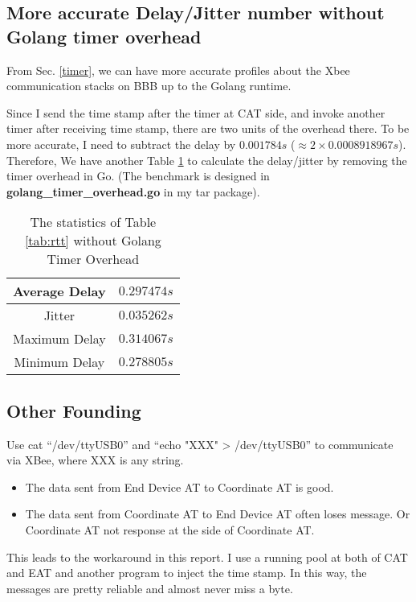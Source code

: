 \documentclass[a4paper,12pt]{article}
\theoremstyle{mytheor}
\begin{document}
\subsection{More accurate Delay/Jitter number without Golang timer overhead} 

From Sec. \ref{timer}, we can have more accurate profiles about the Xbee communication stacks on BBB up to the Golang runtime. 

Since I send the time stamp after the timer at CAT side, and invoke another timer after  receiving time stamp, there are two units of the overhead there. 
To be more accurate, I need to subtract the delay by $0.001784s$ ($\approx 2\times 0.0008918967s$). Therefore, 
We have another Table \ref{tab:sum1} to calculate the delay/jitter by removing the timer overhead in Go. (The benchmark is designed in {\bf  golang\_timer\_overhead.go} in my tar package). 


\begin{table}[h]
	\centering
	\small{
		\caption{The statistics of Table \ref{tab:rtt} without Golang Timer Overhead}
		 \vspace{0.1in}
		\begin{tabular}{|c|r|}  \hline 
			Average Delay & 	$0.297474s$ \\ \hline 
			Jitter 		  & 	$0.035262s$ \\ \hline 
			Maximum Delay &  	$0.314067s$  \\ \hline 
			Minimum Delay &  	$0.278805s$ \\ \hline 
		\end{tabular}
		\label{tab:sum1}
	}
\end{table}		
 
\subsection{Other Founding}

Use cat ``/dev/ttyUSB0'' and ``echo "XXX" > /dev/ttyUSB0'' to communicate via XBee, where XXX is any string.  
\begin{itemize} 
\item The data sent from End Device AT to Coordinate AT is good.   
\item The data sent from Coordinate AT to End Device AT often loses message. Or Coordinate AT not response at the side of  Coordinate AT. 
\end{itemize} 
This leads to the workaround in this report. I use a running pool at both of CAT and EAT and another program to inject the time stamp. In this way, the messages are pretty reliable and almost never miss a byte. 
\end{document}
